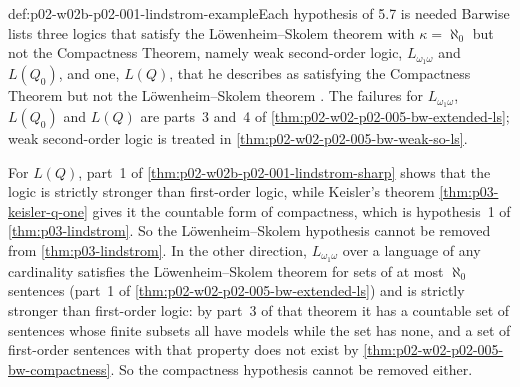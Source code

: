 \begin{hbexample}{def:p02-w02b-p02-001-lindstrom-example}{Each hypothesis of 5.7 is needed}
Barwise lists three logics that satisfy the L\"owenheim--Skolem theorem
with \(\kappa=\aleph_0\) but not the Compactness Theorem, namely weak
second-order logic, \(L_{\omega_1\omega}\) and \(L(Q_0)\), and one, \(L(Q)\),
that he describes as satisfying the Compactness Theorem but not the
L\"owenheim--Skolem theorem
\cite[ch.~A.1, \S5, 5.6, p.~45]{Barwise1977FirstOrder}.  The failures for
\(L_{\omega_1\omega}\), \(L(Q_0)\) and \(L(Q)\) are parts~3 and~4 of
\cref{thm:p02-w02-p02-005-bw-extended-ls}; weak second-order logic is
treated in \cref{thm:p02-w02-p02-005-bw-weak-so-ls}.

For \(L(Q)\), part~1 of \cref{thm:p02-w02b-p02-001-lindstrom-sharp} shows
that the logic is strictly stronger than first-order logic, while Keisler's
theorem \cref{thm:p03-keisler-q-one} gives it the countable form of
compactness, which is hypothesis~1 of \cref{thm:p03-lindstrom}.  So the
L\"owenheim--Skolem hypothesis cannot be removed from
\cref{thm:p03-lindstrom}.  In the other direction, \(L_{\omega_1\omega}\)
over a language of any cardinality satisfies the L\"owenheim--Skolem
theorem for sets of at most \(\aleph_0\) sentences (part~1 of
\cref{thm:p02-w02-p02-005-bw-extended-ls}) and is strictly stronger than
first-order logic: by part~3 of that theorem it has a countable set of
sentences whose finite subsets all have models while the set has none, and
a set of first-order sentences with that property does not exist by
\cref{thm:p02-w02-p02-005-bw-compactness}.  So the compactness hypothesis
cannot be removed either.
\end{hbexample}

